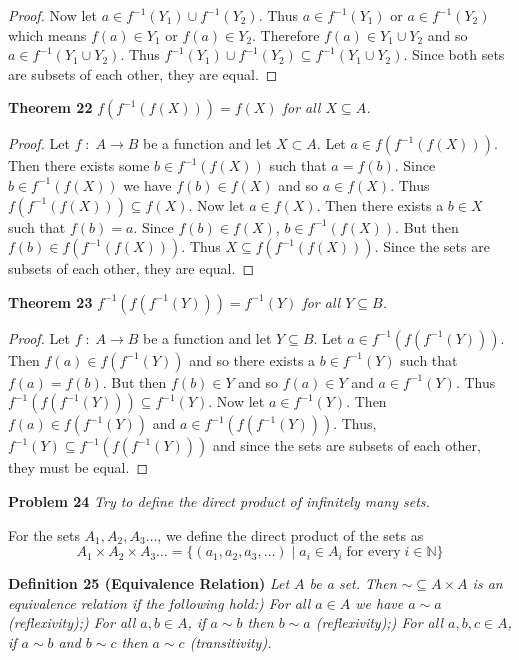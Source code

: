 \documentclass{article}
\begin{document}
\begin{flushleft}
\begin{proof}
Now let $a \in f^{-1} (Y_1) \cup f^{-1} (Y_2)$. Thus $a \in f^{-1} (Y_1)$ or $a \in f^{-1} (Y_2)$ which means $f(a) \in Y_1$ or $f(a) \in Y_2$. Therefore $f(a) \in Y_1 \cup Y_2$ and so $a \in f^{-1} (Y_1 \cup Y_2)$. Thus $f^{-1} (Y_1) \cup f^{-1} (Y_2) \subseteq f^{-1} (Y_1 \cup Y_2)$. Since both sets are subsets of each other, they are equal.
\end{proof}

\textbf{Theorem 22}
\textsl{$f(f^{-1}(f(X))) = f(X)$ for all $X \subseteq A$.}
\begin{proof}
Let $f \; : \; A \rightarrow B$ be a function and let $X \subset A$. Let $a \in f(f^{-1}(f(X)))$. Then there exists some $b \in f^{-1}(f(X))$ such that $a = f(b)$. Since $b \in f^{-1}(f(X))$ we have $f(b) \in f(X)$ and so $a \in f(X)$. Thus $f(f^{-1}(f(X))) \subseteq f(X)$. Now let $a \in f(X)$. Then there exists a $b \in X$ such that $f(b) = a$. Since $f(b) \in f(X)$, $b \in f^{-1}(f(X))$. But then $f(b) \in f(f^{-1}(f(X)))$. Thus $X \subseteq f(f^{-1}(f(X)))$. Since the sets are subsets of each other, they are equal.
\end{proof}

\textbf{Theorem 23}
\textsl{$f^{-1}(f(f^{-1}(Y))) = f^{-1}(Y)$ for all $Y \subseteq B$.}\newline
\begin{proof}
Let $f \; : \; A \rightarrow B$ be a function and let $Y \subseteq B$. Let $a \in f^{-1}(f(f^{-1}(Y)))$. Then $f(a) \in f(f^{-1}(Y))$ and so there exists a $b \in f^{-1}(Y)$ such that $f(a) = f(b)$. But then $f(b) \in Y$ and so $f(a) \in Y$ and $a \in f^{-1}(Y)$. Thus $f^{-1}(f(f^{-1}(Y))) \subseteq f^{-1}(Y)$. Now let $a \in f^{-1}(Y)$. Then $f(a) \in f(f^{-1}(Y))$ and $a \in f^{-1}(f(f^{-1}(Y)))$. Thus, $f^{-1}(Y) \subseteq f^{-1}(f(f^{-1}(Y)))$ and since the sets are subsets of each other, they must be equal.
\end{proof}

\textbf{Problem 24}
\textsl{Try to define the direct product of infinitely many sets.}\newline

For the sets $A_1, A_2, A_3 \dots$, we define the direct product of the sets as
\[
A_1 \times A_2 \times A_3 \dots = \{ (a_1, a_2, a_3, \dots) \mid a_{i} \in A_{i} \; \text{for every} \; i \in \mathbb{N} \}
\]

\textbf{Definition 25 (Equivalence Relation)}
\textsl{Let $A$ be a set. Then $\sim \subseteq A \times A$ is an equivalence relation if the following hold:) For all $a \in A$ we have $a \sim a$ (reflexivity);) For all $a, b \in A$, if $a \sim b$ then $b \sim a$ (reflexivity);) For all $a,b,c \in A$, if $a \sim b$ and $b \sim c$ then $a \sim c$ (transitivity).}\newline


\end{flushleft}
\end{document}
